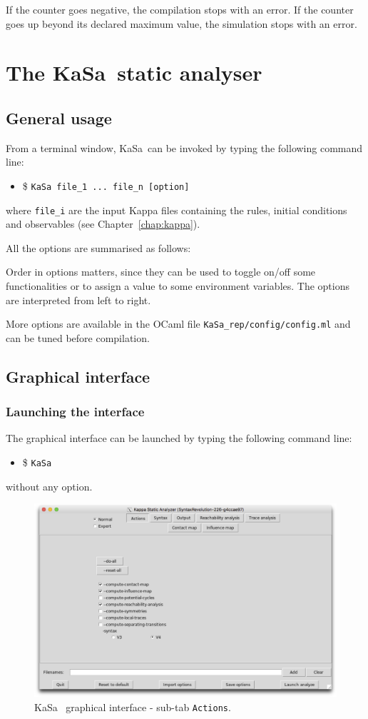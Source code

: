 \documentclass[11pt]{book}
\def\KaSa{\textsf{KaSa}}
\def\ttt#1{\texttt{#1}}
\def\ITE#1{\begin{itemize}#1\end{itemize}}
\begin{document}
If the counter goes negative, the compilation stops with an error. If the counter goes up beyond its declared maximum value, the simulation stops with an error.

\chapter{The \KaSa~static analyser}

\section{General usage}

From a terminal window, \KaSa~can be invoked by typing the following command line:
\ITE{
\item[\$] \ttt{KaSa file\_1 ... file\_n  [option]}
}
where \ttt{file\_i} are the input Kappa files containing the rules, initial conditions and observables (see Chapter~\ref{chap:kappa}).

All the options are summarised as follows:


Order in options matters, since they can be used to toggle on/off some functionalities or to assign a value to some environment variables.
The options are interpreted from left to right.

More options are available in the OCaml file \texttt{KaSa\_rep/config/config.ml} and can be tuned before compilation.

\section{Graphical interface}

\subsection{Launching the interface}

The graphical interface can be launched by typing the following command line:
\ITE{\item[\$] \ttt{KaSa}}

without any option.

\begin{figure}[htbp]
\centering
\includegraphics[width=12cm]{img/kasa_0.png}
\caption{\KaSa~ graphical interface - sub-tab \texttt{Actions}.}
\label{fig:kasa:0}
\end{figure}
\end{document}
